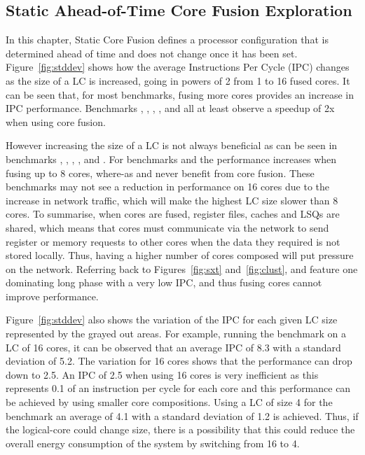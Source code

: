\subsection{Static Ahead-of-Time Core Fusion Exploration}

In this chapter, Static Core Fusion defines a processor configuration that is determined ahead of time and does not change once it has been set.
Figure~\ref{fig:stddev} shows how the average Instructions Per Cycle (IPC) changes as the size of a LC is increased, going in powers of 2 from 1 to 16 fused cores.
It can be seen that, for most benchmarks, fusing more cores provides an increase in IPC performance.
Benchmarks , , , ,  and  all at least observe a speedup of 2x when using core fusion.

However increasing the size of a LC is not always beneficial as can be seen in benchmarks , , , , and .
For benchmarks  and  the performance increases when fusing up to 8 cores, where-as  and  never benefit from core fusion.
These benchmarks may not see a reduction in performance on 16 cores due to the increase in network traffic, which will make the highest LC size slower than 8 cores.
To summarise, when cores are fused, register files, caches and LSQs are shared, which means that cores must communicate via the network to send register or memory requests to other cores when the data they required is not stored locally.
Thus, having a higher number of cores composed will put pressure on the network.
Referring back to Figures~\ref{fig:sxt} and~\ref{fig:clust},  and  feature one dominating long phase with a very low IPC, and thus fusing cores cannot improve performance.

Figure~\ref{fig:stddev} also shows the variation of the IPC for each given LC size represented by the grayed out areas.
For example, running the  benchmark on a LC of 16 cores, it can be observed that an average IPC of 8.3 with a standard deviation of 5.2.
The variation for 16 cores shows that the performance can drop down to 2.5.
An IPC of 2.5 when using 16 cores is very inefficient as this represents 0.1 of an instruction per cycle for each core and this performance can be achieved by using smaller core compositions.
Using a LC of size 4 for the  benchmark an average of 4.1 with a standard deviation of 1.2 is achieved.
Thus, if the logical-core could change size, there is a possibility that this could reduce the overall energy consumption of the system by switching from 16 to 4.


